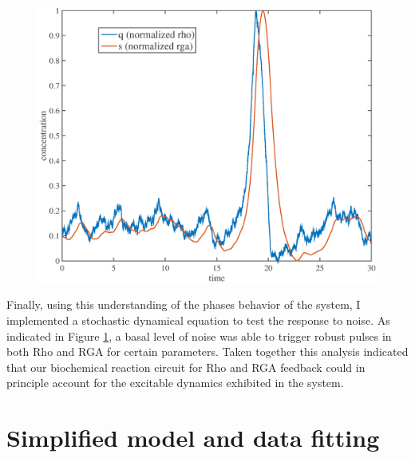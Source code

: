 \begin{figure}[h!]
	\centering
	\includegraphics[width=\hsize]{pulse/randomized_simulation.eps}
	\caption{\label{fig:pulse_rando}  }
\end{figure}

Finally, using this understanding of the phases behavior of the system, I implemented a stochastic dynamical equation to test the response to noise.  As indicated in Figure \ref{fig:pulse_rando}, a basal level of noise was able to trigger robust pulses in both Rho and RGA for certain parameters. Taken together this analysis indicated that our biochemical reaction circuit for Rho and RGA feedback could in principle account for the excitable dynamics exhibited in the system.

\section{Simplified model and data fitting}
